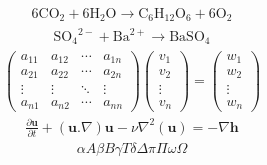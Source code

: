 \documentclass{article}
\begin{document}
\begin{align*}
\mathrm{6CO_2 + 6H_2O \rightarrow C_6H_{12}O_6 + 6O_2}
\end{align*}
\begin{align*}
\mathrm{{SO_4}^{2-} + {Ba}^{2+} \rightarrow BaSO_4}
\end{align*}
\begin{align*}
 \begin{pmatrix}
  a_{11} & a_{12} & \cdots & a_{1n}\\ 
  a_{21} & a_{22} & \cdots & a_{2n}\\
  \vdots & \vdots & \ddots & \vdots\\
  a_{n1} & a_{n2} & \cdots & a_{nn}
\end{pmatrix}
 \begin{pmatrix}
  v_1\\ 
  v_2\\
  \vdots\\
  v_n
\end{pmatrix}
=
 \begin{pmatrix}
  w_1\\ 
  w_2\\
  \vdots\\
  w_n
\end{pmatrix} 
\end{align*}
\begin{align*}
\frac{\partial \textbf{u}}{\partial t} + (\textbf{u}.\nabla)\textbf{u} - \nu{\nabla}^2(\textbf{u}) = -\nabla{\textbf{h}}
\end{align*}
\begin{align*}
{\alpha}{A}{\beta}{B}{\gamma}{T}{\delta}{\Delta}{\pi}{\Pi}{\omega}{\Omega}
\end{align*}
\end{document}
